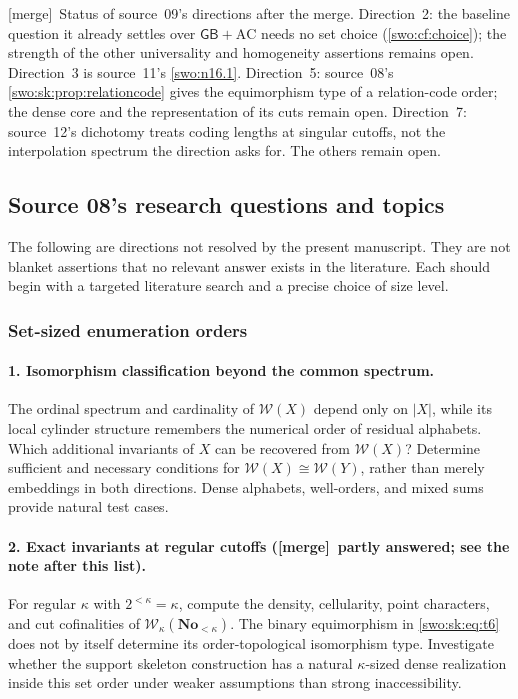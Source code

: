 \documentclass[11pt]{article}
\theoremstyle{definition}
\theoremstyle{remark}
\newcommand{\No}{\mathbf{No}}
\newcommand{\W}{\mathcal W}
\newcommand{\GB}{\mathsf{GB}}
\newcommand{\merge}{\textsf{[merge]}}
\begin{document}

\merge\ Status of source~09's directions after the merge. Direction~2: the
baseline question it already settles over $\GB+\mathrm{AC}$ needs no set
choice (\cref{swo:cf:choice}); the strength of the other universality and
homogeneity assertions remains open. Direction~3 is source~11's
\cref{swo:n16.1}. Direction~5: source~08's \cref{swo:sk:prop:relationcode}
gives the equimorphism type of a relation-code order; the dense core and the
representation of its cuts remain open. Direction~7: source~12's dichotomy
treats coding lengths at singular cutoffs, not the interpolation spectrum the
direction asks for. The others remain open.

\subsection{Source 08's research questions and topics}\label{swo:sk:sec:research}

The following are directions not resolved by the present manuscript.
They are not blanket assertions that no relevant answer exists in the
literature. Each should begin with a targeted literature search and a
precise choice of size level.

\subsubsection{Set-sized enumeration orders}

\paragraph{1. Isomorphism classification beyond the common spectrum.}
The ordinal spectrum and cardinality of $\W(X)$ depend only on $|X|$,
while its local cylinder structure remembers the numerical order of
residual alphabets. Which additional invariants of $X$ can be recovered
from $\W(X)$? Determine sufficient and necessary conditions for
$\W(X)\cong\W(Y)$, rather than merely embeddings in both directions.
Dense alphabets, well-orders, and mixed sums provide natural test cases.

\paragraph{2. Exact invariants at regular cutoffs (\merge\ partly answered; see the note after this list).}
For regular $\kappa$ with $2^{<\kappa}=\kappa$, compute the density,
cellularity, point characters, and cut cofinalities of
$\W_\kappa(\No_{<\kappa})$. The binary equimorphism in \eqref{swo:sk:eq:t6} does not by
itself determine its order-topological isomorphism type. Investigate
whether the support skeleton construction has a natural $\kappa$-sized
dense realization inside this set order under weaker assumptions than
strong inaccessibility.
\end{document}
